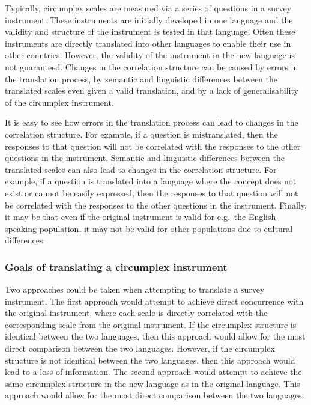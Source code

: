\documentclass[
  authoryear,
  preprint,
  3p]{elsarticle}
\begin{document}
Typically, circumplex scales are measured via a series of questions in a
survey instrument. These instruments are initially developed in one
language and the validity and structure of the instrument is tested in
that language. Often these instruments are directly translated into
other languages to enable their use in other countries. However, the
validity of the instrument in the new language is not guaranteed.
Changes in the correlation structure can be caused by errors in the
translation process, by semantic and linguistic differences between the
translated scales even given a valid translation, and by a lack of
generalisability of the circumplex instrument.

It is easy to see how errors in the translation process can lead to
changes in the correlation structure. For example, if a question is
mistranslated, then the responses to that question will not be
correlated with the responses to the other questions in the instrument.
Semantic and linguistic differences between the translated scales can
also lead to changes in the correlation structure. For example, if a
question is translated into a language where the concept does not exist
or cannot be easily expressed, then the responses to that question will
not be correlated with the responses to the other questions in the
instrument. Finally, it may be that even if the original instrument is
valid for e.g.~the English-speaking population, it may not be valid for
other populations due to cultural differences.

\subsubsection{Goals of translating a circumplex
instrument}\label{goals-of-translating-a-circumplex-instrument}

Two approaches could be taken when attempting to translate a survey
instrument. The first approach would attempt to achieve direct
concurrence with the original instrument, where each scale is directly
correlated with the corresponding scale from the original instrument. If
the circumplex structure is identical between the two languages, then
this approach would allow for the most direct comparison between the two
languages. However, if the circumplex structure is not identical between
the two languages, then this approach would lead to a loss of
information. The second approach would attempt to achieve the same
circumplex structure in the new language as in the original language.
This approach would allow for the most direct comparison between the two
languages.
\end{document}
